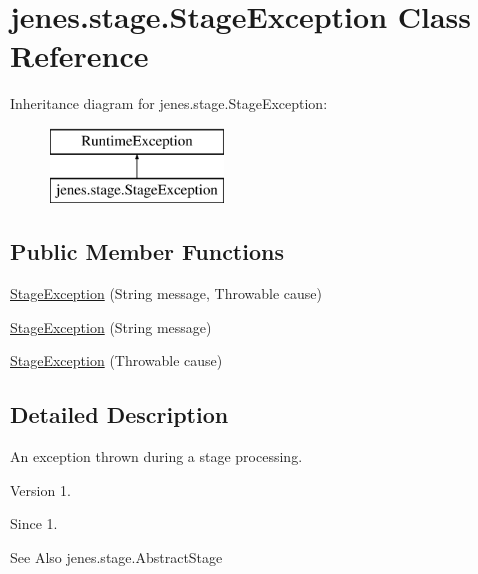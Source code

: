\hypertarget{classjenes_1_1stage_1_1_stage_exception}{\section{jenes.\-stage.\-Stage\-Exception Class Reference}
\label{classjenes_1_1stage_1_1_stage_exception}
}
Inheritance diagram for jenes.\-stage.\-Stage\-Exception\-:\begin{figure}[H]
\begin{center}
\leavevmode
\includegraphics[height=2.000000cm]{classjenes_1_1stage_1_1_stage_exception}
\end{center}
\end{figure}
\subsection*{Public Member Functions}
\begin{DoxyCompactItemize}
\item 
\hyperlink{classjenes_1_1stage_1_1_stage_exception_a4d0eb751151a2693b452176fd2fae090}{Stage\-Exception} (String message, Throwable cause)
\item 
\hyperlink{classjenes_1_1stage_1_1_stage_exception_aff6f4c1b58696d6e0aae42eaa78c3506}{Stage\-Exception} (String message)
\item 
\hyperlink{classjenes_1_1stage_1_1_stage_exception_ab95390b5a08e2fe49d3f354204390710}{Stage\-Exception} (Throwable cause)
\end{DoxyCompactItemize}


\subsection{Detailed Description}
An exception thrown during a stage processing. 

\begin{DoxyVersion}{Version}
1. 
\end{DoxyVersion}
\begin{DoxySince}{Since}
1.
\end{DoxySince}
\begin{DoxySeeAlso}{See Also}
jenes.\-stage.\-Abstract\-Stage 
\end{DoxySeeAlso}


